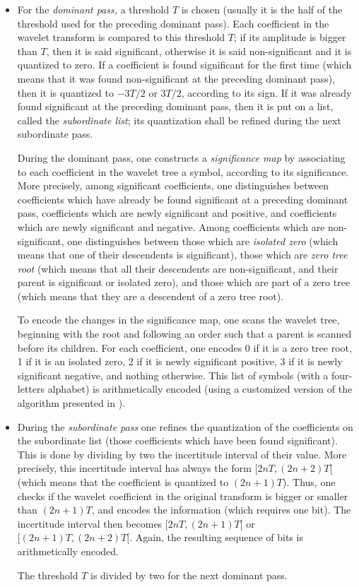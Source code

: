 \begin{itemize} 
\item
For the {\em dominant pass,} a threshold $T$ is chosen (usually it is the half 
of the threshold used for the preceding dominant pass). Each coefficient 
in the wavelet transform is compared to this threshold $T$; if its amplitude 
is bigger than $T$, then it is said significant, otherwise it is said 
non-significant and it is quantized to zero. If a coefficient is found 
significant for the first time (which means that it was found non-significant 
at the preceding dominant pass), then it is quantized to $-3T/2$ or $3T/2$, 
according to its sign. If it was already found significant at the preceding 
dominant pass, then it is put on a list, called the {\em subordinate list}; 
its quantization shall be refined during the next subordinate pass. 

During the dominant pass, one constructs a {\em significance map} 
by associating to each coefficient in the wavelet tree a symbol, 
according to its significance. More precisely, among significant coefficients, 
one distinguishes between coefficients which have already be found significant 
at a preceding dominant pass, coefficients which are newly significant and 
positive, and coefficients which are newly significant and negative. 
Among coefficients which are non-significant, one distinguishes between 
those which are {\em isolated zero} (which means that one of their descendents 
is significant), those which are {\em zero tree root} (which means that 
all their descendents are non-significant, and their parent is significant 
or isolated zero), and those which are part of a zero tree (which means 
that they are a descendent of a zero tree root). 

To encode the changes in the significance map, one scans the wavelet tree, 
beginning with the root and following an order such that a parent 
is scanned before its children. 
For each coefficient, one encodes 0 if it is a zero tree root, 1 if it is 
an isolated zero, 2 if it is newly significant positive, 3 if it is newly 
significant negative, and nothing otherwise. This list of symbols (with 
a four-letters alphabet) is arithmetically encoded 
(using a customized version of the algorithm presented in \cite{kn:wnc}). 

\item
During the {\em subordinate pass} one refines the quantization 
of the coefficients on the subordinate list (those coefficients which 
have been found significant). This is done by dividing by two the incertitude 
interval of their value. More precisely, this incertitude interval has always 
the form $[2nT, (2n+2)T[$ (which means that the coefficient is quantized to 
$(2n+1)T$). Thus, one checks if the wavelet coefficient in the original 
transform is bigger or smaller than $(2n+1)T$, and encodes the information 
(which requires one bit). The incertitude interval then becomes 
$[2nT, (2n+1)T[$ or $[(2n+1)T, (2n+2)T[$. Again, the resulting sequence 
of bits is arithmetically encoded. 

The threshold $T$ is divided by two for the next dominant pass.  

\end{itemize} 


